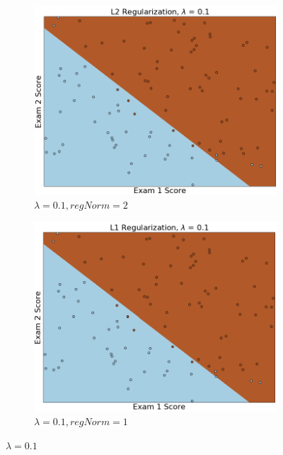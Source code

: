 \documentclass{article}
\begin{document}
\begin{enumerate}
    	\begin{figure}[h!]
     	\centering
     	\begin{subfigure}[b]{0.44\textwidth}
         	\centering
         	\includegraphics[width=\textwidth]
         	{Problem_1_3/fig_L2_3.png}
         	\caption{$\lambda = 0.1, regNorm = 2$}
         	\label{fig:L2_3}
     	\end{subfigure}
     	\hfill
     	\begin{subfigure}[b]{0.44\textwidth}
         	\centering
         	\includegraphics[width=\textwidth]
         	{Problem_1_3/fig_L1_3.png}
         	\caption{$\lambda = 0.1, regNorm = 1$}
         	\label{fig:L1_3}
     	\end{subfigure}
     	\caption{$\lambda=0.1$}
		\end{figure}
		

\end{enumerate}
\end{document}
